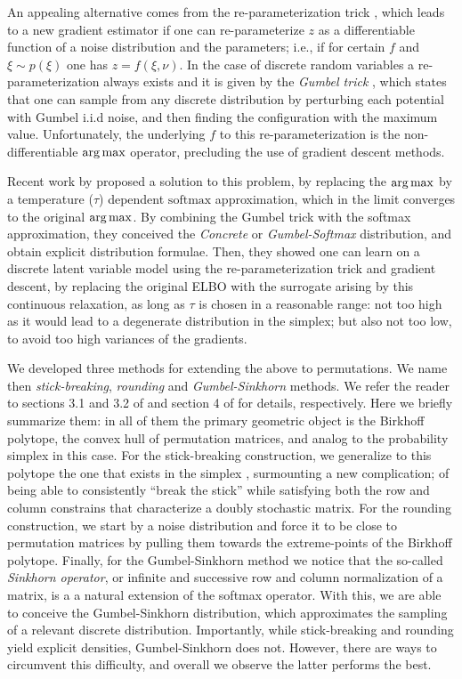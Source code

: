 \documentclass{article}
\begin{document}
An appealing alternative comes from the re-parameterization trick \cite{Kingma2013}, which leads to a new gradient estimator if one can re-parameterize $z$ as a differentiable function of a noise distribution and the parameters; i.e., if for certain $f$ and $\xi\sim p(\xi)$ one has $z=f(\xi,\nu)$. In the case of discrete random variables a re-parameterization always exists and it is given by the \emph{Gumbel trick} \citep{Papandreou2011,Balog2017}, which states that one can sample from any discrete distribution by perturbing each potential with Gumbel i.i.d noise, and then finding the configuration with the maximum value. Unfortunately, the underlying $f$ to this re-parameterization is the non-differentiable $\argmax$ operator, precluding the use of gradient descent methods.

Recent work by \citep{Jang2016,Maddison2016} proposed a solution to this problem, by replacing the $\argmax$ by a temperature ($\tau$) dependent $\mathrm{softmax}$ approximation, which in the limit  converges to the original $\argmax$. By combining the Gumbel trick with the softmax approximation, they conceived the \emph{Concrete} or \emph{Gumbel-Softmax} distribution, and obtain explicit distribution formulae. Then, they showed one can learn on a discrete latent variable model using the re-parameterization trick and gradient descent, by replacing the original ELBO with the surrogate arising by this continuous relaxation, as long as $\tau$ is chosen in a reasonable range: not too high as it would lead to a degenerate distribution in the simplex; but also not too low, to avoid too high variances of the gradients.

We developed three methods for extending the above to permutations. We name then \emph{stick-breaking}, \emph{rounding} and \emph{Gumbel-Sinkhorn} methods. We refer the reader to sections 3.1 and 3.2 of  \cite{Linderman2017} and section 4 of \cite{Anonymous2018learning} for details, respectively. Here we briefly summarize them: in all of them the primary geometric object is the Birkhoff polytope, the convex hull of permutation matrices, and analog to the probability simplex in this case. For the stick-breaking construction, we generalize to this polytope the one that exists in the simplex \citep{Linderman2015}, surmounting a new complication; of being able to consistently ``break the stick'' while satisfying both the row and column constrains that characterize a doubly stochastic matrix. For the rounding construction, we start by a noise distribution and force it to be close to permutation matrices by pulling them towards the extreme-points of the Birkhoff polytope. Finally, for the Gumbel-Sinkhorn method we notice that the so-called \emph{Sinkhorn operator}, or infinite and successive row and column normalization of a matrix, is a a natural extension of the softmax operator. With this, we are able to conceive the Gumbel-Sinkhorn distribution, which approximates the sampling of a relevant discrete distribution. Importantly, while stick-breaking and rounding yield explicit densities, Gumbel-Sinkhorn does not. However, there are ways to circumvent this difficulty, and overall we observe the latter performs the best.
\end{document}
